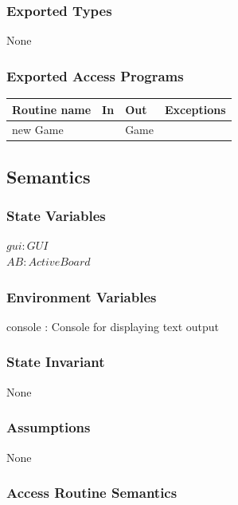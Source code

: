 \documentclass[12pt]{article}
\begin{document}
\subsubsection* {Exported Types}

None

\subsubsection* {Exported Access Programs}

\begin{tabular}{| l | l | l | p{5cm} |}
\hline
\textbf{Routine name} & \textbf{In} & \textbf{Out} & \textbf{Exceptions}\\
\hline
new Game & & Game & ~\\
\hline
\end{tabular}

\subsection* {Semantics}

\subsubsection* {State Variables}

$\mathit{gui}: GUI$\\
$\mathit{AB}: ActiveBoard$

\subsubsection*{Environment Variables}

console : Console for displaying text output

\subsubsection* {State Invariant}

None

\subsubsection* {Assumptions}

None

\subsubsection* {Access Routine Semantics}
\end{document}
